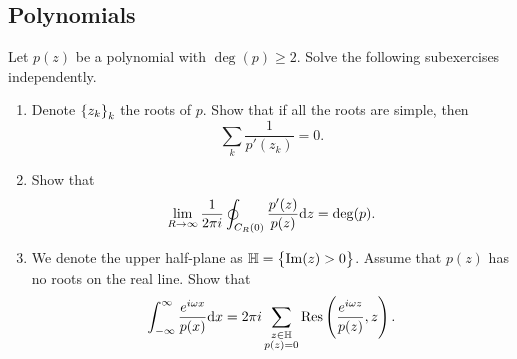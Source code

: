 \documentclass[11pt,a4paper]{article}
\begin{document}
\subsection{Polynomials}

\begin{exercise}
  Let $p(z)$ be a polynomial with $\deg(p) \geq 2$.
  Solve the following subexercises independently.
  \begin{enumerate}
    \item[(1)] Denote $\left\{z_k\right\}_k$ the roots of $p$.
      Show that if all the roots are simple, then
      \[
        \sum_{k} \frac{1}{p'(z_k)} = 0.
      \]
    \item[(2)] Show that
      \[
        \lim_{R \to \infty}
        \frac{1}{2 \pi i}
        \oint_{C_R(0)} \frac{p'(z)}{p(z)} \mathrm{d} z = \deg(p).
      \]
    \item[(3)] We denote the upper half-plane as
      $\mathbb H = \left\{\mathrm{Im}(z) > 0\right\}$.
      Assume that $p(z)$ has no roots on the real line.
      Show that
      \[
        \int_{\ninfty}^{\infty} \frac{e^{i \omega x}}{p(x)} \dx =
        2 \pi i
        \sum_{\substack{z \in \mathbb H \\ p(z) = 0}}
        \Res\del{\frac{e^{i \omega z}}{p(z)},z}.
      \]
  \end{enumerate}
\end{exercise}
\end{document}

